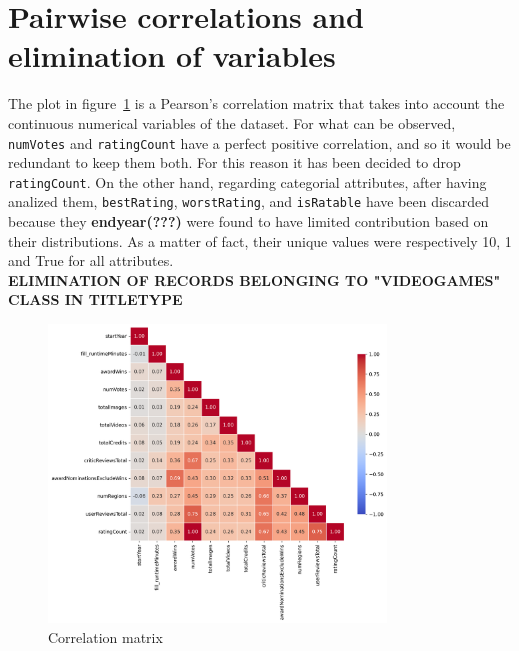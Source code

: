 \section{Pairwise correlations and elimination of variables}\label{sec:correlation}
The plot in figure~\ref{fig:correlation_matrix} is a Pearson's correlation matrix that takes into account the continuous numerical variables of the dataset.
For what can be observed, \texttt{numVotes} and \texttt{ratingCount} have a perfect positive correlation, and so it would be redundant to keep them both.
For this reason it has been decided to drop \texttt{ratingCount}. 
On the other hand, regarding categorial attributes, after having analized them, \texttt{bestRating}, \texttt{worstRating}, and \texttt{isRatable} have been discarded because they \textbf{endyear(???)} were found to have limited contribution based on their distributions.
As a matter of fact, their unique values were respectively 10, 1 and True for all attributes.\\
\textbf{ELIMINATION OF RECORDS BELONGING TO "VIDEOGAMES" CLASS IN TITLETYPE}
\begin{figure}[h!] %
    \centering %
    \includegraphics[width=0.8\textwidth]{plots/correlation_matrix.png} %
    \caption{Correlation matrix} %
    \label{fig:correlation_matrix} %
\end{figure}
